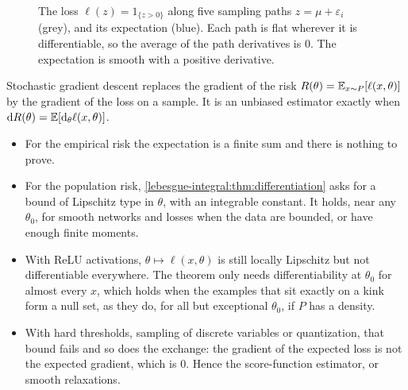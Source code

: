 \begin{notechapter}
\begin{figure}[ht]
\centering
{}
\caption{The loss $\ell(z) = 1_{\{z > 0\}}$ along five sampling paths
$z = \mu + \varepsilon_i$ (grey), and its expectation (blue). Each path
is flat wherever it is differentiable, so the average of the path
derivatives is $0$. The expectation is smooth with a positive
derivative.}
\label{lebesgue-integral:fig:paths}
\end{figure}

\begin{mlthread}
Stochastic gradient descent replaces the gradient of the risk
$R(\theta) = \mathbb{E}_{x\sim P}[\ell(x, \theta)]$ by the gradient of the loss
on a sample. It is an unbiased estimator exactly when
$\mathrm{d} R(\theta) = \mathbb{E}[\mathrm{d}_\theta\ell(x, \theta)]$.
\begin{itemize}[nosep]
  \item For the empirical risk the expectation is a finite sum and
        there is nothing to prove.
  \item For the population risk,
        \cref{lebesgue-integral:thm:differentiation} asks for a bound
        of Lipschitz type in $\theta$, with an integrable constant. It
        holds, near any $\theta_0$, for smooth networks and losses when
        the data are bounded, or have enough finite moments.
  \item With ReLU activations, $\theta\mapsto\ell(x, \theta)$ is still
        locally Lipschitz but not differentiable everywhere. The
        theorem only needs differentiability at $\theta_0$ for almost
        every $x$, which holds when the examples that sit exactly on a
        kink form a null set, as they do, for all but exceptional
        $\theta_0$, if $P$ has a density.
  \item With hard thresholds, sampling of discrete variables or
        quantization, that bound fails and so does the
        exchange: the gradient of the expected loss is not the expected
        gradient, which is $0$. Hence the score-function estimator, or
        smooth relaxations.
\end{itemize}
\end{mlthread}


\end{notechapter}
